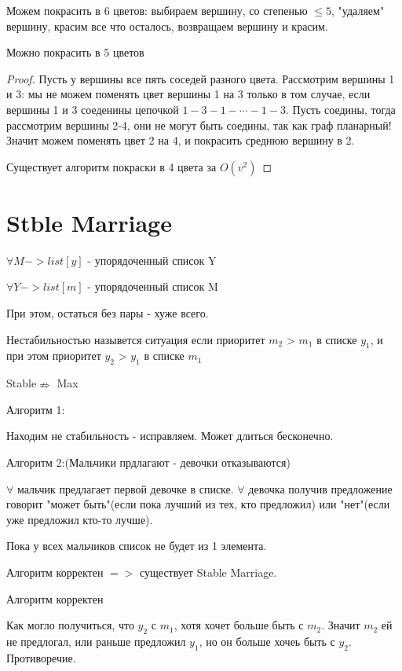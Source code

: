 Можем покрасить в 6 цветов: выбираем вершину, со степенью $\le 5$, "удаляем" вершину, красим все что осталось, возвращаем вершину и красим.
\begin{theorem}{Можно покрасить в 5 цветов}
\end{theorem}
\begin{proof}
Пусть у вершины все пять соседей разного цвета. Рассмотрим вершины 1 и 3: мы не можем поменять цвет вершины 1 на 3 только в том случае, если вершины 1 и 3 соеденины цепочкой $1-3-1-\cdots-1-3$. Пусть соедины, тогда рассмотрим вершины 2-4, они не могут быть соедины, так как граф планарный! Значит можем поменять цвет 2 на 4, и покрасить среднюю вершину в 2.

Существует алгоритм покраски в 4 цвета за $O(v^2)$
\end{proof}

\section{Stble Marriage}


$\forall M -> list[y]$ - упорядоченный список Y

$\forall Y -> list[m]$ - упорядоченный список M

При этом, остаться без пары - хуже всего.



Нестабильностью назывется ситуация если приоритет $m_2$ > $m_1$ в списке $y_1$, и при этом приоритет $y_2$ > $y_1$ в списке $m_1$

\begin{Rem}
Stable$\nRightarrow$ Max
\end{Rem}

Алгоритм 1:

Находим не стабильность - исправляем. Может длиться бесконечно.

Алгоритм 2:(Мальчики прдлагают - девочки отказываются)

$\forall$ мальчик предлагает первой девочке в списке.
$\forall$ девочка получив предложение говорит "может быть"(если пока лучший из тех, кто предложил) или "нет"(если уже предложил кто-то лучше). 

Пока у всех мальчиков список не будет из 1 элемента.

\begin{Rem}
Алгоритм корректен $=>$ существует Stable Marriage.
\end{Rem}

\begin{theorem}{Алгоритм корректен}


Как могло получиться, что $y_2$ с $m_1$, хотя хочет больше быть с $m_2$. Значит $m_2$ ей не предлогал, или раньше предложил $y_1$, но он больше хочеь быть с $y_2$. Противоречие.
\end{theorem}